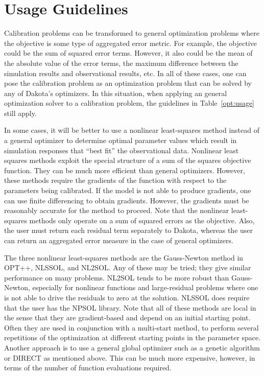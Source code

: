 \section{Usage Guidelines}\label{nls:usage}


Calibration problems can be transformed to general optimization problems 
where the objective is some type of aggregated error metric.  For 
example, the objective could be the sum of squared error terms. 
However, it also could be the mean of the absolute value of the error 
terms, the maximum difference between the simulation results and 
observational results, etc. In all of these cases, one can 
pose the calibration problem as an optimization problem that can be 
solved by any of Dakota's optimizers.  In this situation, when 
applying an general optimization solver to a calibration problem,
the guidelines in Table~\ref{opt:usage} still apply. 

In some cases, it will be better to use a nonlinear least-squares
method instead of a general optimizer to determine optimal parameter 
values which result in simulation responses that ``best fit'' the 
observational data.  Nonlinear least squares methods exploit the 
special structure of a sum of the squares objective function. They 
can be much more efficient than general optimizers.  However, 
these methods require the gradients of the function with 
respect to the parameters being calibrated.  If the model 
is not able to produce gradients, one can use finite differencing 
to obtain gradients.  However, the gradients must be reasonably 
accurate for the method to proceed. Note that the nonlinear 
least-squares methods only operate on a sum of squared errors 
as the objective. Also, the user must return each residual term 
separately to Dakota, whereas the user can return an aggregated 
error measure in the case of general optimizers.

The three nonlinear least-squares methods are the Gauss-Newton method in 
OPT++, NLSSOL, and NL2SOL.  Any of these may be tried;  
they give similar performance on many problems. 
NL2SOL tends to be more robust than Gauss-Newton, especially for nonlinear 
functions and large-residual problems where one is not able to drive 
the residuals to zero at the solution.  NLSSOL does require 
that the user has the NPSOL library.   
Note that all of these methods are local in the sense that they are 
gradient-based and depend on an initial starting point.  Often they 
are used in conjunction with a multi-start method, to perform 
several repetitions of the optimization at different starting 
points in the parameter space.  Another approach is to use 
a general global optimizer such as a genetic algorithm or 
DIRECT as mentioned above.  This can be 
much more expensive, however, in terms of the number of function 
evaluations required. 
